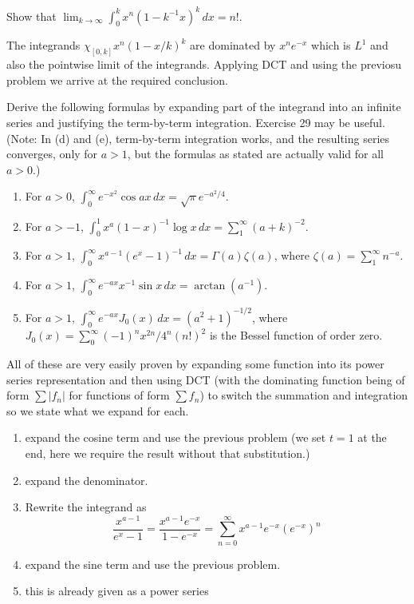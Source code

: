 \documentclass[12pt,a4paper]{article}
\begin{document}
\begin{problem}\label{prob:2-30}
Show that $\lim_{k \to \infty} \int_0^k x^n (1 - k^{-1}x)^k \, dx = n!$.
\end{problem}
\begin{solution}
	The integrands $\chi_{[0,k]}x^n(1-x/k)^k$ are dominated by $x^ne^{-x}$ which is $L^1$ and also the pointwise limit of the integrands. 
	Applying DCT and using the previosu problem we arrive at the required conclusion.
\end{solution}
\begin{problem}\label{prob:2-31}
Derive the following formulas by expanding part of the integrand into an infinite series and justifying the term-by-term integration. Exercise 29 may be useful. (Note: In (d) and (e), term-by-term integration works, and the resulting series converges, only for $a > 1$, but the formulas as stated are actually valid for all $a > 0$.)
\begin{enumerate}[label=\alph*.]
    \item For $a > 0$, $\int_0^\infty e^{-x^2} \cos ax \, dx = \sqrt{\pi}e^{-a^2/4}$.
    \item For $a > -1$, $\int_0^1 x^a (1 - x)^{-1} \log x \, dx = \sum_1^\infty (a + k)^{-2}$.
    \item For $a > 1$, $\int_0^\infty x^{a-1} (e^x - 1)^{-1} \, dx = \Gamma(a) \zeta(a)$, where $\zeta(a) = \sum_1^\infty n^{-a}$.
    \item For $a > 1$, $\int_0^\infty e^{-ax} x^{-1} \sin x \, dx = \arctan(a^{-1})$.
    \item For $a > 1$, $\int_0^\infty e^{-ax} J_0(x) \, dx = (a^2 + 1)^{-1/2}$, where $J_0(x) = \sum_0^\infty (-1)^n x^{2n} / 4^n(n!)^2$ is the Bessel function of order zero.
\end{enumerate}
\end{problem}
\begin{solution}
    All of these are very easily proven by expanding some function into its power series representation and then using DCT (with the dominating function being of form $\sum|f_n|$ for functions of form $\sum f_n$) to switch the summation and integration so we state what we expand for each.
	\begin{enumerate}[label=\alph*.]
		\item expand the cosine term and use the previous problem (we set $t=1$ at the end, here we require the result without that substitution.)
		\item expand the denominator.
		\item Rewrite the integrand as
			\[
				\frac{x^{a-1}}{e^x-1}= \frac{x^{a-1}e^{-x}}{1-e^{-x}}=\sum_{n=0}^\infty x^{a-1}e^{-x}(e^{-x})^n
			\]
		\item expand the sine term and use the previous problem.
		\item this is already given as a power series
	\end{enumerate}
	
\end{solution}
\end{document}
